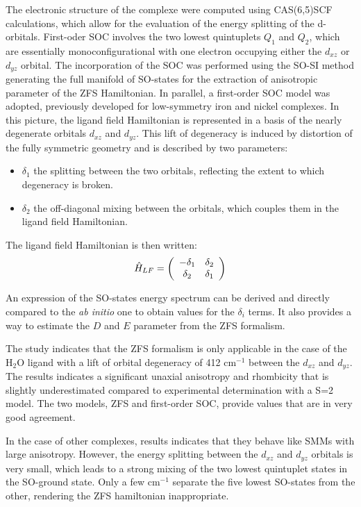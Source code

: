 \documentclass[12pt]{report}
\numberwithin{equation}{section}
\begin{document}
The electronic structure of the complexe were computed using CAS(6,5)SCF calculations, which allow for the evaluation of the energy splitting of the d-orbitals.
First-oder SOC involves the two lowest quintuplets $Q_1$ and $Q_2$, which are essentially monoconfigurational with one electron occupying either the $d_{xz}$ or $d_{yz}$ orbital.
The incorporation of the SOC was performed using the SO-SI method generating the full manifold of SO-states for the extraction of anisotropic parameter of the ZFS Hamiltonian.
In parallel, a first-order SOC model was adopted, previously developed for low-symmetry iron and nickel complexes.
In this picture, the ligand field Hamiltonian is represented in a basis of the nearly degenerate orbitals $d_{xz}$ and $d_{yz}$.
This lift of degeneracy is induced by distortion of the fully symmetric geometry and is described by two parameters:

\begin{itemize}
    \item $\delta_1$ the splitting between the two orbitals, reflecting the extent to which degeneracy is broken.
    \item $\delta_2$ the off-diagonal mixing between the orbitals, which couples them in the ligand field Hamiltonian.
\end{itemize}

The ligand field Hamiltonian is then written:
\[ \hat{H}_{LF}= \left( \begin{array}{c c}
    -\delta_1 & \delta_2 \\
    \delta_2& \delta_1
    \end{array} \right)
\]

An expression of the SO-states energy spectrum can be derived and directly compared to the \textit{ab initio} one to obtain values for the $\delta_i$ terms.
It also provides a way to estimate the $D$ and $E$ parameter from the ZFS formalism.


The study indicates that the ZFS formalism is only applicable in the case of the H$_2$O ligand with a lift of orbital degeneracy of 412 cm$^{-1}$ between the $d_{xz}$ and $d_{yz}$.
The results indicates a significant unaxial anisotropy and rhombicity that is slightly underestimated compared to experimental determination with a S=2 model.
The two models, ZFS and first-order SOC, provide values that are in very good agreement.

In the case of other complexes, results indicates that they behave like SMMs with large anisotropy.
However, the energy splitting between the $d_{xz}$ and $d_{yz}$ orbitals is very small, which leads to a strong mixing of the two lowest quintuplet states in the SO-ground state.
Only a few cm$^{-1}$ separate the five lowest SO-states from the other, rendering the ZFS hamiltonian inappropriate.
\end{document}
